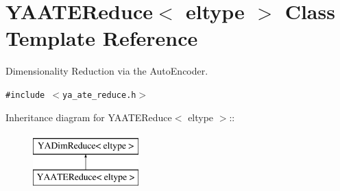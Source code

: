 \hypertarget{class_y_a_a_t_e_reduce}{
\section{YAATEReduce$<$ eltype $>$ Class Template Reference}
\label{class_y_a_a_t_e_reduce}
}
Dimensionality Reduction via the Auto\-Encoder.  


{\tt \#include $<$ya\_\-ate\_\-reduce.h$>$}

Inheritance diagram for YAATEReduce$<$ eltype $>$::\begin{figure}[H]
\begin{center}
\leavevmode
\includegraphics[height=2cm]{class_y_a_a_t_e_reduce}
\end{center}
\end{figure}
